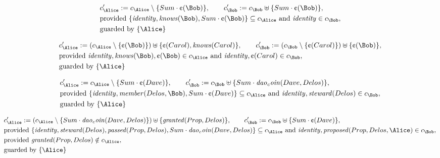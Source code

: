 \begin{align*}
&
c'_
{
\Alice
}
 := 
c_
{
\Alice
}
 \setminus 
\{
Sum
\cdot
\text{\textcent}
(
\Bob
)
\}
, \qquad 
c'_
{
\Bob
}
 := 
c_
{
\Bob
}
 \uplus 
\{
Sum
\cdot
\text{\textcent}
(
\Bob
)
\}
,\\
&
\text{provided } 
\{
\mathit{
identity
}
,
\mathit{
knows
}
(
\Bob
)
,
Sum
\cdot
\text{\textcent}
(
\Bob
)
\}
 \subseteq c_
{
\Alice
}
 \text{ and } 
\mathit{
identity
}
 \in c_
{
\Bob
}
,\\
&
\text{guarded by } \{
\Alice
\}
\end{align*}

\begin{align*}
&
c'_
{
\Alice
}
 := 
(c_
{
\Alice
}
 \setminus 
\{
\text{\textcent}
(
\Bob
)
\}
) \uplus 
\{
\text{\textcent}
(
Carol
)
,
\mathit{
knows
}
(
Carol
)
\}
, \qquad 
c'_
{
\Bob
}
 := 
(c_
{
\Bob
}
 \setminus 
\{
\text{\textcent}
(
Carol
)
\}
) \uplus 
\{
\text{\textcent}
(
\Bob
)
\}
,\\
&
\text{provided } 
\mathit{
identity
}
,
\mathit{
knows
}
(
\Bob
)
,
\text{\textcent}
(
\Bob
)
 \in c_
{
\Alice
}
 \text{ and } 
\mathit{
identity
}
,
\text{\textcent}
(
Carol
)
 \in c_
{
\Bob
}
,\\
&
\text{guarded by } \{
\Alice
\}
\end{align*}

\begin{align*}
&
c'_
{
\Alice
}
 := 
c_
{
\Alice
}
 \setminus 
\{
Sum
\cdot
\text{\textcent}
(
Dave
)
\}
, \qquad 
c'_
{
\Bob
}
 := 
c_
{
\Bob
}
 \uplus 
\{
Sum
\cdot
\mathit{
dao_coin
}
(
Dave
,
Delos
)
\}
,\\
&
\text{provided } 
\{
\mathit{
identity
}
,
\mathit{
member
}
(
Delos
,
\Bob
)
,
Sum
\cdot
\text{\textcent}
(
Dave
)
\}
 \subseteq c_
{
\Alice
}
 \text{ and } 
\mathit{
identity
}
,
\mathit{
steward
}
(
Delos
)
 \in c_
{
\Bob
}
,\\
&
\text{guarded by } \{
\Alice
\}
\end{align*}

\begin{align*}
&
c'_
{
\Alice
}
 := 
(c_
{
\Alice
}
 \setminus 
\{
Sum
\cdot
\mathit{
dao_coin
}
(
Dave
,
Delos
)
\}
) \uplus 
\{
\mathit{
granted
}
(
Prop
,
Delos
)
\}
, \qquad 
c'_
{
\Bob
}
 := 
c_
{
\Bob
}
 \uplus 
\{
Sum
\cdot
\text{\textcent}
(
Dave
)
\}
,\\
&
\text{provided } 
\{
\mathit{
identity
}
,
\mathit{
steward
}
(
Delos
)
,
\mathit{
passed
}
(
Prop
,
Delos
)
,
Sum
\cdot
\mathit{
dao_coin
}
(
Dave
,
Delos
)
\}
 \subseteq c_
{
\Alice
}
 \text{ and } 
\mathit{
identity
}
,
\mathit{
proposed
}
(
Prop
,
Delos
,
\Alice
)
 \in c_
{
\Bob
}
,\\
&
\text{provided } 
\mathit{
granted
}
(
Prop
,
Delos
)
 \notin c_
{
\Alice
}
,\\
&
\text{guarded by } \{
\Alice
\}
\end{align*}
